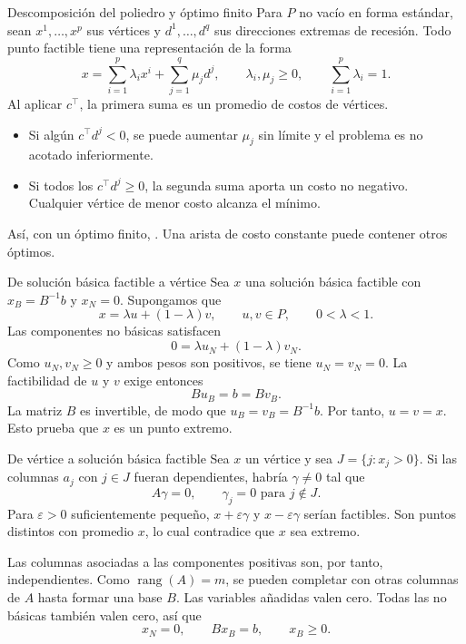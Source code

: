 \documentclass[aspectratio=169,12pt]{beamer}
\begin{document}
\begin{frame}{Descomposición del poliedro y óptimo finito}
Para $P$ no vacío en forma estándar, sean $x^1,\ldots,x^p$ sus vértices
y $d^1,\ldots,d^q$ sus direcciones extremas de recesión. Todo
punto factible tiene una representación de la forma
\[
 x=\sum_{i=1}^p\lambda_i x^i+\sum_{j=1}^q\mu_j d^j,\qquad
 \lambda_i,\mu_j\ge0,\qquad \sum_{i=1}^p\lambda_i=1 .
\]
Al aplicar $c^\top$, la primera suma es un promedio de costos de vértices.
\begin{itemize}
\item Si algún $c^\top d^j<0$, se puede aumentar $\mu_j$ sin límite y
      el problema es no acotado inferiormente.
\item Si todos los $c^\top d^j\ge0$, la segunda suma aporta un costo
      no negativo. Cualquier vértice de menor costo alcanza el mínimo.
\end{itemize}
\medskip

Así, con un óptimo finito, .
Una arista de costo constante puede contener otros óptimos.
\end{frame}

\begin{frame}[label=teoria-sbf]{De solución básica factible a vértice}
Sea $x$ una solución básica factible con $x_B=B^{-1}b$ y $x_N=0$.
Supongamos que
\[
 x=\lambda u+(1-\lambda)v,\qquad
 u,v\in P,\qquad 0<\lambda<1.
\]
Las componentes no básicas satisfacen
\[
 0=\lambda u_N+(1-\lambda)v_N.
\]
Como $u_N,v_N\ge0$ y ambos pesos son positivos, se tiene $u_N=v_N=0$.
La factibilidad de $u$ y $v$ exige entonces
\[
 Bu_B=b=Bv_B.
\]
La matriz $B$ es invertible, de modo que $u_B=v_B=B^{-1}b$.
Por tanto, $u=v=x$. Esto prueba que $x$ es un punto extremo.
\end{frame}

\begin{frame}{De vértice a solución básica factible}
Sea $x$ un vértice y sea $J=\{j:x_j>0\}$. Si las columnas $a_j$
con $j\in J$ fueran dependientes, habría $\gamma\ne0$ tal que
\[
 A\gamma=0,\qquad \gamma_j=0 \text{ para } j\notin J.
\]
Para $\varepsilon>0$ suficientemente pequeño,
$x+\varepsilon\gamma$ y $x-\varepsilon\gamma$ serían factibles.
Son puntos distintos con promedio $x$, lo cual contradice que
$x$ sea extremo.
\medskip

Las columnas asociadas a las componentes positivas son, por tanto,
independientes. Como $\operatorname{rang}(A)=m$, se pueden completar
con otras columnas de $A$ hasta formar una base $B$. Las variables
añadidas valen cero. Todas las no básicas también valen cero, así que
\[
 x_N=0,\qquad Bx_B=b,\qquad x_B\ge0 .
\]
\end{frame}
\end{document}
